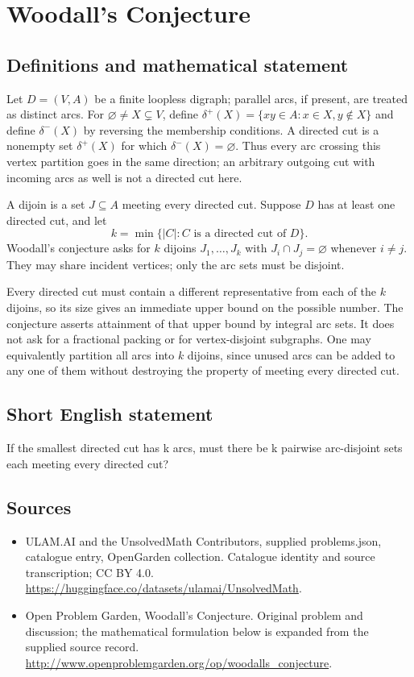\documentclass[11pt,a4paper]{article}
\begin{document}
\section*{Woodall's Conjecture}\label{statement}

\subsection{Definitions and mathematical statement}
Let $D=(V,A)$ be a finite loopless digraph; parallel arcs, if present, are
treated as distinct arcs. For $\varnothing\ne X\subsetneq V$, define
$\delta^+(X)=\{xy\in A:x\in X,y\notin X\}$ and define $\delta^-(X)$
by reversing the membership conditions. A directed cut is a nonempty
set $\delta^+(X)$ for which $\delta^-(X)=\varnothing$. Thus every arc
crossing this vertex partition goes in the same direction; an arbitrary
outgoing cut with incoming arcs as well is not a directed cut here.

A dijoin is a set $J\subseteq A$ meeting every directed cut. Suppose
$D$ has at least one directed cut, and let
\[
             k=\min\{|C|:C\text{ is a directed cut of }D\}.
\]
Woodall's conjecture asks for $k$ dijoins $J_1,\ldots,J_k$ with
$J_i\cap J_j=\varnothing$ whenever $i\ne j$. They may share incident
vertices; only the arc sets must be disjoint.

Every directed cut must contain a different representative from each
of the $k$ dijoins, so its size gives an immediate upper bound on the
possible number. The conjecture asserts attainment of that upper bound
by integral arc sets. It does not ask for a fractional packing or for
vertex-disjoint subgraphs. One may equivalently partition all arcs into
$k$ dijoins, since unused arcs can be added to any one of them without
destroying the property of meeting every directed cut.
\subsection{Short English statement}
If the smallest directed cut has k arcs, must there be k pairwise arc-disjoint sets each meeting every directed cut?
\subsection{Sources}
\begin{itemize}
\item[S1] ULAM.AI and the UnsolvedMath Contributors, supplied problems.json, catalogue entry, OpenGarden collection. Catalogue identity and source transcription; CC BY 4.0.
\url{https://huggingface.co/datasets/ulamai/UnsolvedMath}.
\item[S2] Open Problem Garden, Woodall's Conjecture. Original problem and discussion; the mathematical formulation below is expanded from the supplied source record.
\url{http://www.openproblemgarden.org/op/woodalls_conjecture}.
\end{itemize}
\end{document}
